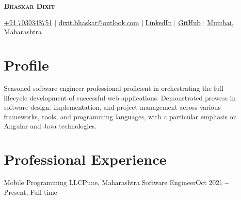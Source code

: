 \documentclass{resume}
\begin{document}

\begin{center}
    \textbf{\Huge \scshape Bhaskar Dixit} 

    \small
    \faMobile \hspace{.5pt} \href{tel:917030348751}{+91 7030348751}
    $|$
    \faAt \hspace{.5pt} \href{mailto:dixit.bhaskar@outlook.com}{dixit.bhaskar@outlook.com}
    $|$
    \faLinkedinSquare \hspace{.5pt} \href{https://www.linkedin.com/in/bhaskar-dixit}{LinkedIn}
    $|$
    \faGithub \hspace{.5pt} \href{https://github.com/devBhaskar98}{GitHub}
    $|$
    \faMapMarker \hspace{.5pt} \href{https://maps.app.goo.gl/cxQaZHjSpMqCGx5s9}{Mumbai, Maharashtra}
\end{center}

\section{Profile}
{ Seasoned software engineer professional proficient in orchestrating the full lifecycle development of successful web applications. Demonstrated prowess in software design, implementation, and project management across various frameworks, tools, and programming languages, with a particular emphasis on Angular and Java technologies. }

\section{Professional Experience}
\vspace{3pt}

    \resumeSubHeadingListStart
    \resumeSubheading
          {Mobile Programming LLC}{Pune, Maharashtra}
          {Software Engineer}{Oct 2021 \textbf{--} Present, Full-time}
    
\end{document}
